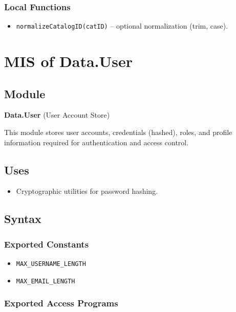 \documentclass[12pt, titlepage]{article}
\begin{document}
\subsubsection{Local Functions}
\begin{itemize}
    \item \texttt{normalizeCatalogID(catID)} – optional normalization (trim, case).
\end{itemize}



\section{MIS of Data.User} \label{Data.User}

\subsection{Module}
\textbf{Data.User} \; (User Account Store)

This module stores user accounts, credentials (hashed), roles, and profile information required for authentication and access control.

\subsection{Uses}
\begin{itemize}
    \item Cryptographic utilities for password hashing.
\end{itemize}

\subsection{Syntax}

\subsubsection{Exported Constants}
\begin{itemize}
    \item \texttt{MAX\_USERNAME\_LENGTH}
    \item \texttt{MAX\_EMAIL\_LENGTH}
\end{itemize}

\subsubsection{Exported Access Programs}
\end{document}
